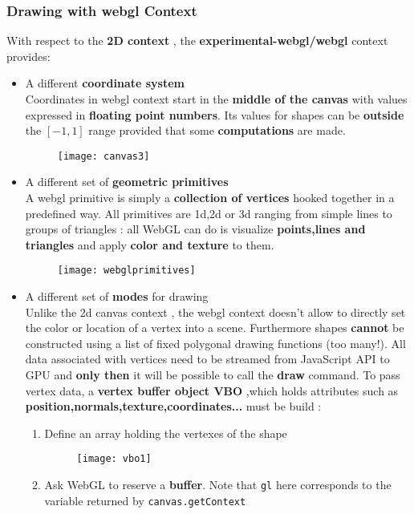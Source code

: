 \subsubsection{Drawing with webgl Context}
With respect to the \textbf{2D context} , the \textbf{experimental-webgl/webgl} context provides:
\begin{itemize}
\item A different \textbf{coordinate system}\\
Coordinates in webgl context start in the \textbf{middle of the canvas} with values expressed in \textbf{floating point numbers}. Its values for shapes can be \textbf{outside} the $[-1,1]$ range provided that some \textbf{computations} are made.
  \begin{figure}[H]
 \centering
 \texttt{[image: canvas3]} 
 \end{figure}
 \item A different set of \textbf{geometric primitives}\\
 A webgl primitive is simply a \textbf{collection of vertices} hooked together in a predefined way. All primitives are 1d,2d or 3d ranging from simple lines to groups of triangles : all WebGL can do is visualize \textbf{points,lines and triangles} and apply \textbf{color and texture} to them. 
   \begin{figure}[H]
 \centering
 \texttt{[image: webglprimitives]} 
 \end{figure}
\item A different set of \textbf{modes} for drawing\\
Unlike the 2d canvas context , the webgl context doesn't allow to directly set the color or location of a vertex into a scene. Furthermore shapes \textbf{cannot} be constructed using a list of fixed polygonal drawing functions (too many!). All data associated with vertices need to be streamed from JavaScript API to GPU and \textbf{only then} it will be possible to call the \textbf{draw} command. To pass vertex data, a \textbf{vertex buffer object VBO} ,which holds attributes such as \textbf{position,normals,texture,coordinates...} must be build :
\begin{enumerate}
\item Define an array holding the vertexes of the shape
   \begin{figure}[H]
 \centering
 \texttt{[image: vbo1]} 
 \end{figure}
\item Ask WebGL to reserve a \textbf{buffer}. Note that \texttt{gl} here corresponds to the variable returned by \texttt{canvas.getContext}

\end{enumerate}
\end{itemize}
